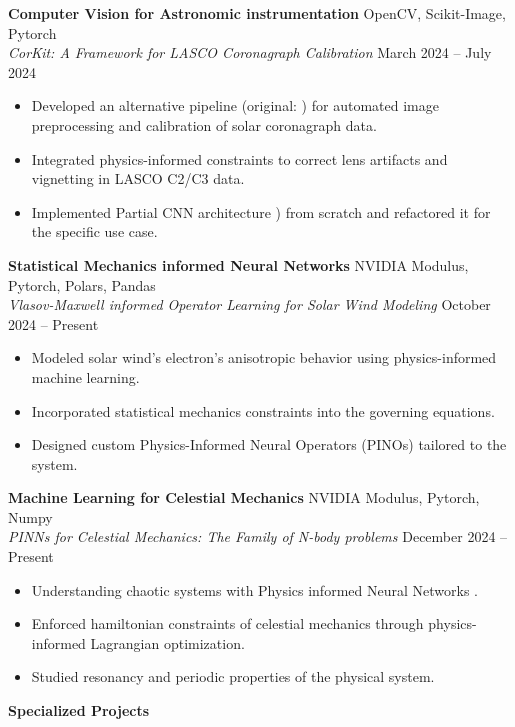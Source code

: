 \documentclass[11pt]{article}
\begin{document}
\textbf{Computer Vision for Astronomic instrumentation} \hfill OpenCV, Scikit-Image, Pytorch \\
\textit{CorKit: A Framework for LASCO Coronagraph Calibration} \hfill March 2024 – July 2024
\begin{itemize}[noitemsep]
    \item Developed an alternative pipeline (original: \cite{lasco}) for automated image preprocessing and calibration of solar coronagraph data.
    \item Integrated physics-informed constraints to correct lens artifacts and vignetting in LASCO C2/C3 data.
    \item Implemented Partial CNN architecture \cite{conv}) from scratch and refactored it for the specific use case.
\end{itemize}

\textbf{Statistical Mechanics informed Neural Networks} \hfill NVIDIA Modulus, Pytorch, Polars, Pandas \\
\textit{Vlasov-Maxwell informed Operator Learning for Solar Wind Modeling} \hfill October 2024 – Present
\begin{itemize}[noitemsep]
    \item Modeled solar wind's electron's anisotropic behavior using physics-informed machine learning.
    \item Incorporated statistical mechanics constraints into the governing equations.
    \item Designed custom Physics-Informed Neural Operators (PINOs) \cite{pino} tailored to the system.
\end{itemize}

\textbf{Machine Learning for Celestial Mechanics} \hfill NVIDIA Modulus, Pytorch, Numpy \\
\textit{PINNs for Celestial Mechanics: The Family of N-body problems} \hfill December 2024 – Present
\begin{itemize}[noitemsep]
    \item Understanding chaotic systems with Physics informed Neural Networks \cite{pinn}.
    \item Enforced hamiltonian constraints of celestial mechanics through physics-informed Lagrangian optimization.
    \item Studied resonancy and periodic properties of the physical system.
\end{itemize}

\begin{center}
    \textbf{Specialized Projects}
\end{center}
\end{document}
